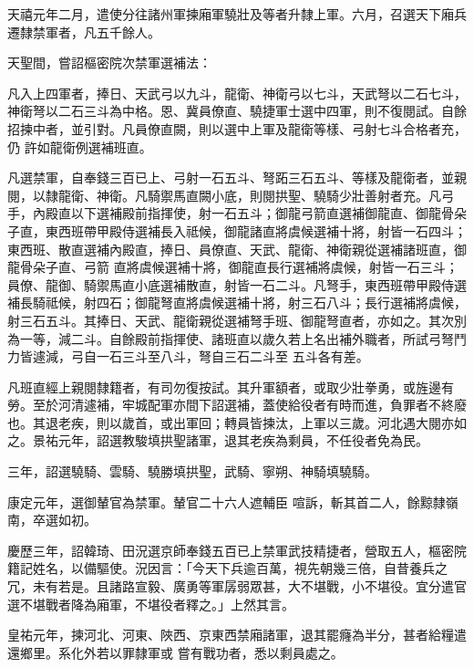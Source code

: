 \begin{pinyinscope}
 天禧元年二月，遣使分往諸州軍揀廂軍驍壯及等者升隸上軍。六月，召選天下廂兵遷隸禁軍者，凡五千餘人。



 天聖間，嘗詔樞密院次禁軍選補法：



 凡入上四軍者，捧日、天武弓以九斗，龍衛、神衛弓以七斗，天武弩以二石七斗，神衛弩以二石三斗為中格。恩、冀員僚直、驍捷軍士選中四軍，則不復閱試。自餘招揀中者，並引對。凡員僚直闕，則以選中上軍及龍衛等樣、弓射七斗合格者充，仍
 許如龍衛例選補班直。



 凡選禁軍，自奉錢三百已上、弓射一石五斗、弩跖三石五斗、等樣及龍衛者，並親閱，以隸龍衛、神衛。凡騎禦馬直闕小底，則閱拱聖、驍騎少壯善射者充。凡弓手，內殿直以下選補殿前指揮使，射一石五斗；御龍弓箭直選補御龍直、御龍骨朵子直，東西班帶甲殿侍選補長入祗候，御龍諸直將虞候選補十將，射皆一石四斗；東西班、散直選補內殿直，捧日、員僚直、天武、龍衛、神衛親從選補諸班直，御龍骨朵子直、弓箭
 直將虞候選補十將，御龍直長行選補將虞候，射皆一石三斗；員僚、龍御、騎禦馬直小底選補散直，射皆一石二斗。凡弩手，東西班帶甲殿侍選補長騎祗候，射四石；御龍弩直將虞候選補十將，射三石八斗；長行選補將虞候，射三石五斗。其捧日、天武、龍衛親從選補弩手班、御龍弩直者，亦如之。其次別為一等，減二斗。自餘殿前指揮使、諸班直以歲久若上名出補外職者，所試弓弩鬥力皆遽減，弓自一石三斗至八斗，弩自三石二斗至
 五斗各有差。



 凡班直經上親閱隸籍者，有司勿復按試。其升軍額者，或取少壯拳勇，或旌邊有勞。至於河清遽補，牢城配軍亦間下詔選補，蓋使給役者有時而進，負罪者不終廢也。其退老疾，則以歲首，或出軍回；轉員皆揀汰，上軍以三歲。河北遇大閱亦如之。景祐元年，詔選教駿填拱聖諸軍，退其老疾為剩員，不任役者免為民。



 三年，詔選驍騎、雲騎、驍勝填拱聖，武騎、寧朔、神騎填驍騎。



 康定元年，選御輦官為禁軍。輦官二十六人遮輔臣
 喧訴，斬其首二人，餘黥隸嶺南，卒選如初。



 慶歷三年，詔韓琦、田況選京師奉錢五百已上禁軍武技精捷者，營取五人，樞密院籍記姓名，以備驅使。況因言：「今天下兵逾百萬，視先朝幾三倍，自昔養兵之冗，未有若是。且諸路宣毅、廣勇等軍孱弱眾甚，大不堪戰，小不堪役。宜分遣官選不堪戰者降為廂軍，不堪役者釋之。」上然其言。



 皇祐元年，揀河北、河東、陜西、京東西禁廂諸軍，退其罷癃為半分，甚者給糧遣還鄉里。系化外若以罪隸軍或
 嘗有戰功者，悉以剩員處之。




\end{pinyinscope}
